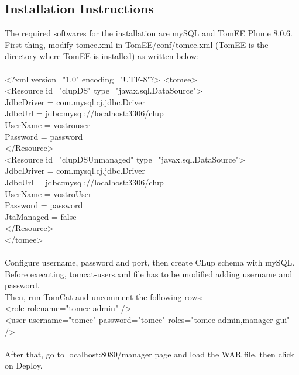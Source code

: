 \renewcommand{\thesubsection}{\Alph{subsection}}
\subsection {Installation Instructions}
The required softwares for the installation are mySQL and TomEE Plume 8.0.6. \\ First thing, modify tomee.xml in TomEE/conf/tomee.xml (TomEE is the directory where TomEE is installed) as written below:\\\\
<?xml version="1.0" encoding="UTF-8"?>
<tomee>\\
<Resource id="clupDS" type="javax.sql.DataSource">\\
 JdbcDriver = com.mysql.cj.jdbc.Driver\\
JdbcUrl = jdbc:mysql://localhost:3306/clup\\
 UserName = vostrouser\\
 Password = password\\
</Resource>\\
<Resource id="clupDSUnmanaged" type="javax.sql.DataSource">\\
JdbcDriver = com.mysql.cj.jdbc.Driver\\
JdbcUrl = jdbc:mysql://localhost:3306/clup\\
UserName = vostroUser\\
 Password = password\\
JtaManaged = false\\
</Resource>\\
</tomee>\\
\\
Configure username, password and port, then create CLup schema with mySQL.\\
Before executing, tomcat-users.xml file has to be modified adding username and password.\\
Then, run TomCat and uncomment the following rows:\\
<role rolename="tomee-admin" />\\
 <user username="tomee" password="tomee" roles="tomee-admin,manager-gui" />\\
\\
 After that, go to localhost:8080/manager page and load the WAR file, then click on Deploy.

